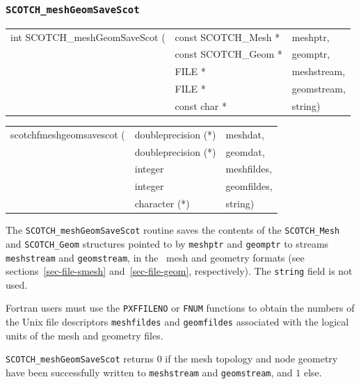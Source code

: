 \subsubsection{{\tt SCOTCH\_meshGeomSaveScot}}

\begin{itemize}
\progsyn

{\tt\begin{tabular}{l@{}ll}
int SCOTCH\_meshGeomSaveScot ( & const SCOTCH\_Mesh * & meshptr, \\
                               & const SCOTCH\_Geom * & geomptr, \\
                               & FILE *               & meshstream, \\
                               & FILE *               & geomstream, \\
                               & const char *         & string)
\end{tabular}}

{\tt\begin{tabular}{l@{}ll}
scotchfmeshgeomsavescot ( & doubleprecision (*) & meshdat, \\
                          & doubleprecision (*) & geomdat, \\
                          & integer             & meshfildes, \\
                          & integer             & geomfildes, \\
                          & character (*)       & string)
\end{tabular}}

\progdes

The {\tt SCOTCH\_meshGeomSaveScot} routine saves the contents
of the {\tt SCOTCH\_\lbt Mesh} and {\tt SCOTCH\_\lbt Geom}
structures pointed to by {\tt meshptr} and {\tt geomptr} to
streams {\tt mesh\lbt stream} and {\tt geom\lbt stream}, in
the \scotch\ mesh and geometry formats (see
sections~\ref{sec-file-smesh} and~\ref{sec-file-geom},
respectively). The {\tt string} field is not used.

Fortran users must use the {\tt PXFFILENO} or {\tt FNUM} functions to
obtain the numbers of the Unix file descriptors {\tt mesh\lbt fildes}
and {\tt geom\lbt fildes} associated with the logical units of the
mesh and geometry files.

\progret

{\tt SCOTCH\_meshGeomSaveScot} returns $0$ if the mesh topology and
node geometry have been successfully written to {\tt mesh\lbt stream}
and {\tt geom\lbt stream}, and $1$ else.
\end{itemize}

